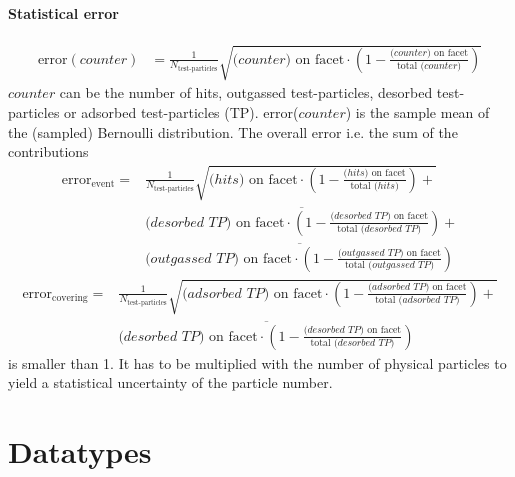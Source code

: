 \subsubsection*{Statistical error}
\begin{equation}
	\label{eq:error}
	\begin{split}
	\text{error}(counter)&=
	 \frac{1}{N_\textrm{test-particles}}\sqrt{\text{($counter$) on facet} \cdot \left(1 - \frac{\text{($counter$) on facet}}{\text{total ($counter$)}}\right)}
	\end{split}
\end{equation}
$counter$ can be the number of hits, outgassed test-particles, desorbed test-particles or adsorbed test-particles (TP). error($counter$) is the sample mean of the (sampled) Bernoulli distribution. The overall error i.e. the sum of the contributions
\begin{equation}
\begin{split}
\label{eq:summation_of_error_event}
	\text{error}_\textrm{event}=&
	\frac{1}{N_\textrm{test-particles}}\sqrt{\text{($hits$) on facet} \cdot \left(1 - \frac{\text{($hits$) on facet}}{\text{total ($hits$)}}\right)+}\\
	&\overline{\text{($desorbed\,\,TP$) on facet} \cdot \left(1 - \frac{\text{($desorbed\,\,TP$) on facet}}{\text{total ($desorbed\,\,TP$)}}\right)+}\\
	&\overline{\text{($outgassed\,\,TP$) on facet} \cdot \left(1 - \frac{\text{($outgassed\,\,TP$) on facet}}{\text{total ($outgassed\,\,TP$)}}\right)}
\end{split}
\end{equation}
\begin{equation}
\begin{split}
\label{eq:summation_of_error_covering}
\text{error}_\textrm{covering}=&
\frac{1}{N_\textrm{test-particles}}\sqrt{\text{($adsorbed\,\,TP$) on facet} \cdot \left(1 - \frac{\text{($adsorbed\,\,TP$) on facet}}{\text{total ($adsorbed\,\,TP$)}}\right)+}\\
&\overline{\text{($desorbed\,\,TP$) on facet} \cdot \left(1 - \frac{\text{($desorbed\,\,TP$) on facet}}{\text{total ($desorbed\,\,TP$)}}\right)}
\end{split}
\end{equation}
is smaller than 1. It has to be multiplied with the number of physical particles to yield a statistical uncertainty of the particle number.
\chapter{Datatypes}
